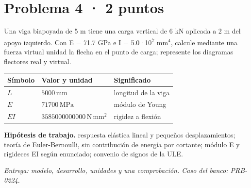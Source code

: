 \par\medskip\noindent\begin{minipage}{\linewidth}

\section{Problema 4 · 2 puntos}

Una viga biapoyada de 5 m tiene una carga vertical de 6 kN aplicada a 2 m del apoyo izquierdo. Con E = 71.7 GPa e I = 5.0·10\textsuperscript{7} mm$^4$, calcule mediante una fuerza virtual unidad la flecha en el punto de carga; represente los diagramas flectores real y virtual.

\par\medskip\noindent\begin{tabular}{@{}p{.18\linewidth}p{.26\linewidth}p{.48\linewidth}@{}}
\toprule Símbolo & Valor y unidad & Significado\\\midrule
$L$ & $5000\,\mathrm{mm}$ & longitud de la viga\\
$E$ & $71700\,\mathrm{MPa}$ & módulo de Young\\
$EI$ & $3585000000000\,\mathrm{N\,mm^2}$ & rigidez a flexión\\
\bottomrule\end{tabular}\par\medskip



\par\textbf{Hipótesis de trabajo.} respuesta elástica lineal y pequeños desplazamientos; teoría de Euler-Bernoulli, sin contribución de energía por cortante; módulo E y rigideces EI según enunciado; convenio de signos de la ULE.

\par\textit{Entrega: modelo, desarrollo, unidades y una comprobación. Caso del banco: PRB-0224.}\end{minipage}\par\medskip

